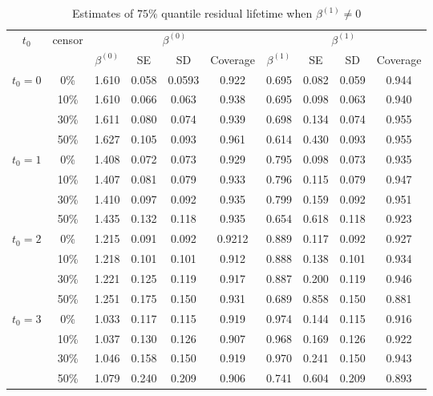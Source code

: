 \documentclass[titlepage,english,12pt]{article}
\begin{document}
	\begin{table}[H] \label{table:6}
		\caption{Estimates of $75\%$ quantile residual lifetime when $\beta^{(1)} \neq 0$}
		\centering
		\begin{tabular}{|c|c|c|c|c|c|c|c|c|c|}
			\hline
			\multirow{2}{*}{$t_0$} & \multirow{2}{*}{censor} & \multicolumn{4}{c|}{$\beta^{(0)}$} & \multicolumn{4}{c|}{$\beta^{(1)}$}\\ \cline{3-10}
			& & $\beta^{(0)}$ & SE & SD  & Coverage  & $\beta^{(1)}$ & SE & SD & Coverage\\
			\hline\hline
			\multirow{4}{*}{$t_0=0$} & 0\% & 1.610 & 0.058 & 0.0593 & 0.922 & 0.695 & 0.082 & 0.059 & 0.944 \\
			& 10\% & 1.610 & 0.066 & 0.063 & 0.938 & 0.695 & 0.098 & 0.063 & 0.940 \\
			& 30\% & 1.611 & 0.080 & 0.074 & 0.939 & 0.698 & 0.134 & 0.074 & 0.955 \\
			& 50\% & 1.627 & 0.105 & 0.093 & 0.961 & 0.614 & 0.430 & 0.093 & 0.955 \\
			\hline
			\multirow{4}{*}{$t_0=1$} & 0\% & 1.408 & 0.072 & 0.073 & 0.929 & 0.795 & 0.098 & 0.073 & 0.935 \\
			& 10\% & 1.407 & 0.081 & 0.079 & 0.933 & 0.796 & 0.115 & 0.079 & 0.947 \\
			& 30\% & 1.410 & 0.097 & 0.092 & 0.935 & 0.799 & 0.159 & 0.092 & 0.951 \\
			& 50\% & 1.435 & 0.132 & 0.118 & 0.935 & 0.654 & 0.618 & 0.118 & 0.923 \\
			\hline
			\multirow{4}{*}{$t_0=2$} & 0\% & 1.215 & 0.091 & 0.092 & 0.9212 & 0.889 & 0.117 & 0.092 & 0.927 \\
			& 10\% & 1.218 & 0.101 & 0.101 & 0.912 & 0.888 & 0.138 & 0.101 & 0.934 \\
			& 30\% & 1.221 & 0.125 & 0.119 & 0.917 & 0.887 & 0.200 & 0.119 & 0.946 \\
			& 50\% & 1.251 & 0.175 & 0.150 & 0.931 & 0.689 & 0.858 & 0.150 & 0.881 \\
			\hline
			\multirow{4}{*}{$t_0=3$} & 0\% & 1.033 & 0.117 & 0.115 & 0.919 & 0.974 & 0.144 & 0.115 & 0.916 \\
			& 10\% & 1.037 & 0.130 & 0.126 & 0.907 & 0.968 & 0.169 & 0.126 & 0.922 \\
			& 30\% & 1.046 & 0.158 & 0.150 & 0.919 & 0.970 & 0.241 & 0.150 & 0.943 \\
			& 50\% & 1.079 & 0.240 & 0.209 & 0.906 & 0.741 & 0.604 & 0.209 & 0.893 \\	
			\hline
		\end{tabular}
	\end{table}
\end{document}
